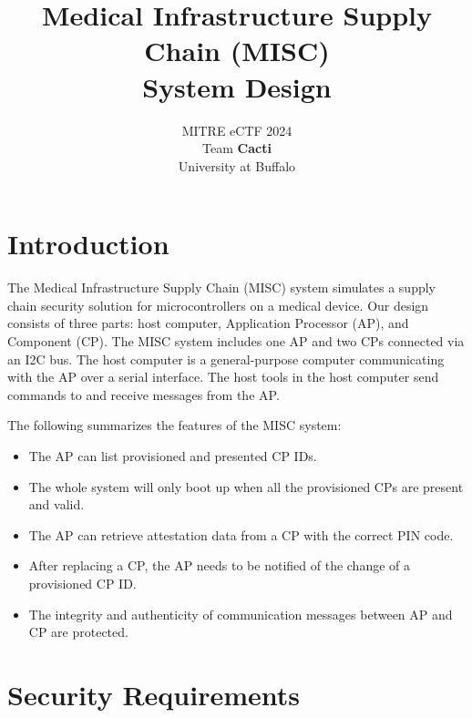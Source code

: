 \documentclass[11pt,oneside,onecolumn,letterpaper]{article}
\title{Medical Infrastructure Supply Chain (MISC) \\ System Design}
\author{MITRE eCTF 2024\\Team \textbf{Cacti}\\ University at Buffalo}
\date{}
\begin{document}
	\normalsize
	
	
	\maketitle
	
	\renewcommand{\thepage}{System Design, Team Cacti, University at Buffalo--\arabic{page}}
	\setcounter{page}{1} \normalsize
	
	\newcommand{\flagRollback}{\textsf{Rollback}\xspace}
	
	\section{Introduction}
	The Medical Infrastructure Supply Chain (MISC) system simulates a supply chain security solution for microcontrollers on a medical device.
	Our design consists of three parts: host computer, Application Processor (AP), and Component (CP).
	The MISC system includes one AP and two CPs connected via an I2C bus.
	The host computer is a general-purpose computer communicating with the AP over a serial interface.
	The host tools in the host computer send commands to and receive messages from the AP.
	
	The following summarizes the features of the MISC system:
	\begin{itemize}
		\item The AP can list provisioned and presented CP IDs.
		\item The whole system will only boot up when all the provisioned CPs are present and valid.
		\item The AP can retrieve attestation data from a CP with the correct PIN code.
		\item After replacing a CP,
		the AP needs to be notified of the change of a provisioned CP ID.
		\item The integrity and authenticity of communication messages between AP and CP are protected.
	\end{itemize}
	
	\section{Security Requirements}
	
\end{document}
